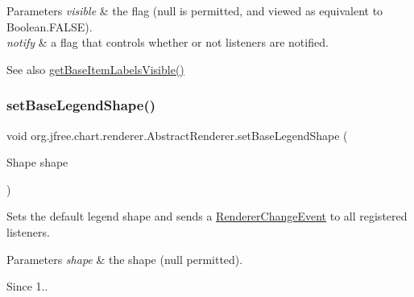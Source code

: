 \begin{DoxyParams}{Parameters}
{\em visible} & the flag ({\ttfamily null} is permitted, and viewed as equivalent to {\ttfamily Boolean.\+F\+A\+L\+SE}). \\
\hline
{\em notify} & a flag that controls whether or not listeners are notified.\\
\hline
\end{DoxyParams}
\begin{DoxySeeAlso}{See also}
\mbox{\hyperlink{classorg_1_1jfree_1_1chart_1_1renderer_1_1_abstract_renderer_a360a67714905022c4373c33ad83626b8}{get\+Base\+Item\+Labels\+Visible()}} 
\end{DoxySeeAlso}
\mbox{\label{classorg_1_1jfree_1_1chart_1_1renderer_1_1_abstract_renderer_ab132444b05bc1462d068bbfbdc6f4e9e}} 
\subsubsection{\texorpdfstring{set\+Base\+Legend\+Shape()}{setBaseLegendShape()}}
{\footnotesize\ttfamily void org.\+jfree.\+chart.\+renderer.\+Abstract\+Renderer.\+set\+Base\+Legend\+Shape (\begin{DoxyParamCaption}\item[{Shape}]{shape }\end{DoxyParamCaption})}

Sets the default legend shape and sends a \mbox{\hyperlink{}{Renderer\+Change\+Event}} to all registered listeners.


\begin{DoxyParams}{Parameters}
{\em shape} & the shape ({\ttfamily null} permitted).\\
\hline
\end{DoxyParams}
\begin{DoxySince}{Since}
1.. 
\end{DoxySince}
\mbox{\label{classorg_1_1jfree_1_1chart_1_1renderer_1_1_abstract_renderer_ae4d2f12e3988663d2a9dbd3f13deb21a}} 

